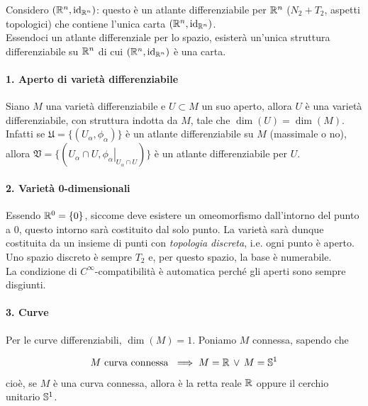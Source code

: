 Considero $ (\R^{n},\id_{\R^{n}}) $: questo è un atlante differenziabile per $ \R^{n} $ ($ N_{2}+T_{2} $, aspetti topologici) che contiene l'unica carta $ (\R^{n},\id_{\R^{n}}) $.\\
Essendoci un atlante differenziale per lo spazio, esisterà un'unica struttura differenziabile su $ \R^{n} $ di cui $ (\R^{n},\id_{\R^{n}}) $ è una carta.

\paragraph{1. Aperto di varietà differenziabile}

Siano $ M $ una varietà differenziabile e $ U \subset M $ un suo aperto, allora $ U $ è una varietà differenziabile, con struttura indotta da $ M $, tale che $ \dim (U) = \dim (M) $.\\
Infatti se $ \mathfrak{U} = \{(U_{\alpha},\phi_{\alpha})\} $ è un atlante differenziabile su $ M $ (massimale o no), allora $ \mathfrak{V} = \{(U_{\alpha} \cap U,\left. \phi_{\alpha} \right|_{U_{\alpha} \cap U})\} $ è un atlante differenziabile per $ U $.

\paragraph{2. Varietà 0-dimensionali}

Essendo $ \R^{0} = \{0\} $, siccome deve esistere un omeomorfismo dall'intorno del punto a $ 0 $, questo intorno sarà costituito dal solo punto. La varietà sarà dunque costituita da un insieme di punti con \textit{topologia discreta}, i.e. ogni punto è aperto. Uno spazio discreto è sempre $ T_{2} $ e, per questo spazio, la base è numerabile.\\
La condizione di $ C^{\infty} $-compatibilità è automatica perché gli aperti sono sempre disgiunti.

\paragraph{3. Curve}

Per le curve differenziabili, $ \dim (M) = 1 $. Poniamo $ M $ connessa, sapendo che

\begin{theorem}
	\begin{equation}
		M \text{ curva connessa } \implies M = \R \, \lor \, M = \S^{1}
	\end{equation}

	cioè, se $ M $ è una curva connessa, allora è la retta reale $ \R $ oppure il cerchio unitario $ \S^{1} $.
\end{theorem}

